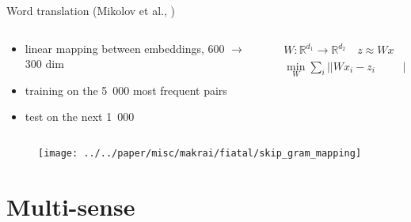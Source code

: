 \documentclass[10pt]{beamer}%
\newcommand{\Ro}{\mathbb{R}^{d_1}}
\newcommand{\Rt}{\mathbb{R}^{d_2}}
\begin{document}
\begin{frame} {Word translation (Mikolov et al., \citeyear{Mikolov:2013x})}
  \begin{columns}
    \begin{column}{.65\textwidth}
  \begin{itemize}
    \item linear mapping between embeddings, 600 $\rightarrow$ 300 dim
    \item training on the 5~000 most frequent pairs  \\
    \item test on the next 1~000
  \end{itemize}
    \end{column}
    \begin{column}{.4\textwidth}
      \begin{align*}
        W : \Ro \rightarrow \Rt \quad z\approx Wx \\
        \min_W \sum_i || Wx_i - z_i &|| ^ 2
      \end{align*}
    \end{column}
  \end{columns}
    \begin{figure}
      \texttt{[image: ../../paper/misc/makrai/fiatal/skip\_gram\_mapping]}
    \end{figure}
\end{frame}

\section {Multi-sense}
\end{document}
